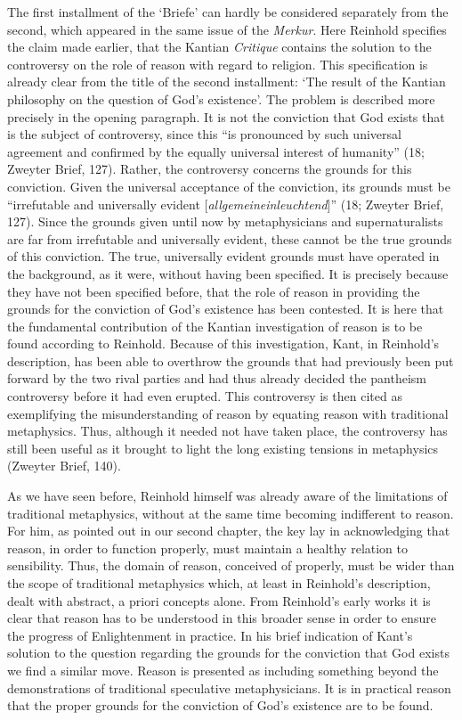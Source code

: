  The first installment of the `Briefe' can hardly be considered separately from the second, which appeared in the same issue of the \textit{Merkur}. Here Reinhold specifies the claim made earlier, that the Kantian \textit{Critique }contains the solution to the controversy on the role of reason with regard to religion. This specification is already clear from the title of the second installment: `The result of the Kantian philosophy on the question of God's existence'. The problem is described more precisely in the opening paragraph. It is not the conviction that God exists that is the subject of controversy, since this ``is pronounced by such universal agreement and confirmed by the equally universal interest of humanity'' (18; Zweyter Brief, 127). Rather, the controversy concerns the grounds for this conviction. Given the universal acceptance of the conviction, its grounds must be ``irrefutable and universally evident [\textit{allgemeineinleuchtend}]'' (18; Zweyter Brief, 127). Since the grounds given until now by metaphysicians and supernaturalists are far from irrefutable and universally evident, these cannot be the true grounds of this conviction. The true, universally evident grounds must have operated in the background, as it were, without having been specified. It is precisely because they have not been specified before, that the role of reason in providing the grounds for the conviction of God's existence has been contested. It is here that the fundamental contribution of the Kantian investigation of reason is to be found according to Reinhold. Because of this investigation, Kant, in Reinhold's description, has been able to overthrow the grounds that had previously been put forward by the two rival parties and had thus already decided the pantheism controversy before it had even erupted. This controversy is then cited as exemplifying the misunderstanding of reason by equating reason with traditional metaphysics. Thus, although it needed not have taken place, the controversy has still been useful as it brought to light the long existing tensions in metaphysics (Zweyter Brief, 140).

As we have seen before, Reinhold himself was already aware of the limitations of traditional metaphysics, without at the same time becoming indifferent to reason. For him, as pointed out in our second chapter, the key lay in acknowledging that reason, in order to function properly, must maintain a healthy relation to sensibility. Thus, the domain of reason, conceived of properly, must be wider than the scope of traditional metaphysics which, at least in Reinhold's description, dealt with abstract, a priori concepts alone. From Reinhold's early works it is clear that reason has to be understood in this broader sense in order to ensure the progress of Enlightenment in practice. In his brief indication of Kant's solution to the question regarding the grounds for the conviction that God exists we find a similar move. Reason is presented as including something beyond the demonstrations of traditional speculative metaphysicians. It is in practical reason that the proper grounds for the conviction of God's existence are to be found. 

